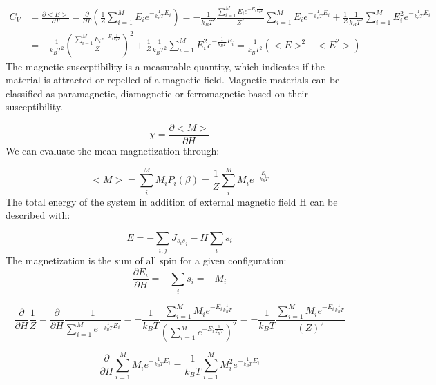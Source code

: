 \documentclass[10pt,a4paper]{article}
\begin{document}
\begin{align}
C_V &=\frac{\partial <E>}{\partial T} = \frac{\partial}{\partial T} \left( \frac{1}{Z }\sum_{i=1}^{M}E_i e ^{ - \frac {1}{k_BT} E_i}\right) = -\frac{1}{k_B T^2 } \frac{\sum_{i=1}^{M} E_i e^{-E_i \frac{1}{k_BT}}}{ Z^2}\sum_{i=1}^{M}E_i e ^{ - \frac {1}{k_BT} E_i} +\frac{1}{Z}\frac{1}{k_BT^2}\sum_{i=1}^{M}E_i^2 e ^{ - \frac {1}{k_BT} E_i} \\
 &= -\frac{1}{k_B T^2 } \left( \frac{\sum_{i=1}^{M} E_i e^{-E_i \frac{1}{k_BT}}}{ Z} \right)^2 +\frac{1}{Z}\frac{1}{k_BT^2}\sum_{i=1}^{M}E_i^2 e ^{ - \frac {1}{k_BT} E_i} = \frac{1}{k_B T^2 } \left( <E>^2 - <E^2> \right)
\end{align}
The magnetic susceptibility is a measurable quantity, which indicates if the material is attracted or repelled of a magnetic field.
Magnetic materials can be classified as paramagnetic, diamagnetic or ferromagnetic based on their susceptibility.

\begin{equation}
\chi =\frac{\partial <M>}{\partial H} 
\end{equation}
We can evaluate the mean magnetization through:

\begin{equation}
<M> = \sum_{i}^{M}M_iP_i(\beta)= \frac{1}{Z}\sum_{i}^{M}M_ie^{- \frac{E_i}{k_BT}}
\end{equation}
The total energy of the system in addition of external magnetic field H can be described with:

\begin{equation}
E = -\sum_{i,j} J_{s_is_j}- H\sum_{i}s_i
\end{equation}
The magnetization is the sum of all spin for a given configuration:
\begin{equation}
\frac{\partial E_i}{\partial H} =- \sum_{i}s_i = -M_i
\end{equation}

\begin{equation}
\frac{\partial}{\partial H}\frac{1}{Z} = \frac{\partial}{\partial H}\frac{1}{\sum_{i=1}^{M}e^{- \frac{1}{k_BT} E_i}} = -\frac{1}{k_B T} \frac{\sum_{i=1}^{M} M_i e^{-E_i \frac{1}{k_BT}}}{\left(\sum_{i=1}^{M} e^{-E_i \frac{1}{k_BT}} \right)^2}=-\frac{1}{k_B T} \frac{\sum_{i=1}^{M} M_i e^{-E_i \frac{1}{k_BT}}}{\left( Z\right)^2}
\end{equation}

\begin{equation}
\frac{\partial}{\partial H}\sum_{i=1}^{M}M_i e ^{ - \frac {1}{k_BT} E_i} = \frac{1}{k_BT}\sum_{i=1}^{M}M_i^2 e ^{ - \frac {1}{k_BT} E_i}
\end{equation}
\end{document}
